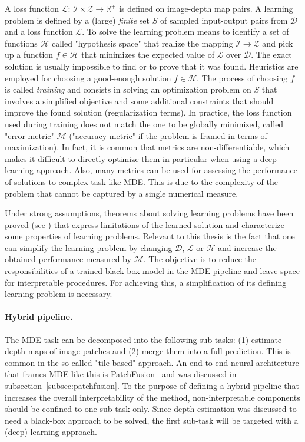 A loss function $\mathcal{L}: \, \mathcal{I} \times \mathcal{Z} \rightarrow \mathbb{R}^{+}$ is defined on image-depth map pairs.
A learning problem is defined by a (large) \textit{finite} set $S$ of sampled input-output pairs from $\mathcal{D}$ and a loss function $\mathcal{L}$.
To solve the learning problem means to identify a set of functions $\mathcal{H}$ called "hypothesis space" \cite{ML_book} that realize the mapping $\mathcal{I} \rightarrow \mathcal{Z}$ and pick up a function $f \in \mathcal{H}$ that minimizes the expected value of $\mathcal{L}$ over $\mathcal{D}$.
The exact solution is usually impossible to find or to prove that it was found.
Heuristics are employed for choosing a good-enough solution $f \in \mathcal{H}$.
The process of choosing $f$ is called \textit{training} and consists in solving an optimization problem on $S$ that involves a simplified objective and some additional constraints that should improve the found solution (regularization terms).
In practice, the loss function used during training does not match the one to be globally minimized, called "error metric" $\mathcal{M}$ ("accuracy metric" if the problem is framed in terms of maximization).
In fact, it is common that metrics are non-differentiable, which makes it difficult to directly optimize them in particular when using a deep learning approach. 
Also, many metrics can be used for assessing the performance of solutions to complex task like MDE.
This is due to the complexity of the problem that cannot be captured by a single numerical measure.

Under strong assumptions, theorems about solving learning problems have been proved (see \cite{ML_book}) that express limitations of the learned solution and characterize some properties of learning problems.
Relevant to this thesis is the fact that one can simplify the learning problem by changing $\mathcal{D}$, $\mathcal{L}$ or $\mathcal{H}$ and increase the obtained performance measured by $\mathcal{M}$. 
The objective is to reduce the responsibilities of a trained black-box model in the MDE pipeline and leave space for interpretable procedures.
For achieving this, a simplification of its defining learning problem is necessary.

\vspace{0.5cm}

\paragraph{Hybrid pipeline.}
The MDE task can be decomposed into the following sub-tasks: (1) estimate depth maps of image patches and (2) merge them into a full prediction.
This is common in the so-called "tile based" approach.
An end-to-end neural architecture that frames MDE like this is PatchFusion~\cite{PatchFusion} and was discussed in subsection~\ref{subsec:patchfusion}.
To the purpose of defining a hybrid pipeline that increases the overall interpretability of the method, non-interpretable components should be confined to one sub-task only.
Since depth estimation was discussed to need a black-box approach to be solved, the first sub-task will be targeted with a (deep) learning approach.

